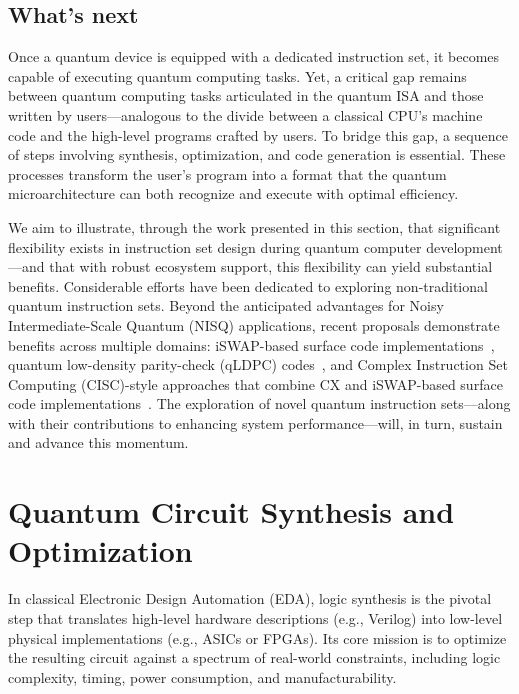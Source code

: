 \documentclass[a4paper,onecolumn,11pt,unpublished]{quantumarticle}
\begin{document}
\subsection{What's next}

Once a quantum device is equipped with a dedicated instruction set, it becomes capable of executing quantum computing tasks. Yet, a critical gap remains between quantum computing tasks articulated in the quantum ISA and those written by users---analogous to the divide between a classical CPU's machine code and the high-level programs crafted by users. To bridge this gap, a sequence of steps involving synthesis, optimization, and code generation is essential. These processes transform the user's program into a format that the quantum microarchitecture can both recognize and execute with optimal efficiency.

We aim to illustrate, through the work presented in this section, that significant flexibility exists in instruction set design during quantum computer development---and that with robust ecosystem support, this flexibility can yield substantial benefits.
Considerable efforts have been dedicated to exploring non-traditional quantum instruction sets. Beyond the anticipated advantages for Noisy Intermediate-Scale Quantum (NISQ) applications, recent proposals demonstrate benefits across multiple domains: iSWAP-based surface code implementations~\cite{eickbusch2024demonstrating}, quantum low-density parity-check (qLDPC) codes~\cite{geher2025directional}, and Complex Instruction Set Computing (CISC)-style approaches that combine CX and iSWAP-based surface code implementations~\cite{zhou2024halmaroutingbasedtechniquedefect, geher2025directional}. The exploration of novel quantum instruction sets---along with their contributions to enhancing system performance---will, in turn, sustain and advance this momentum.

\section{Quantum Circuit Synthesis and Optimization}\label{sec:circuit}

In classical Electronic Design Automation (EDA), logic synthesis is the pivotal step that translates high-level hardware descriptions (e.g., Verilog) into low-level physical implementations (e.g., ASICs or FPGAs). Its core mission is to optimize the resulting circuit against a spectrum of real-world constraints, including logic complexity, timing, power consumption, and manufacturability.
\end{document}
